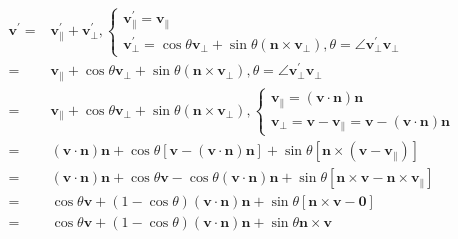 \documentclass[
]{book}
\theoremstyle{definition}
\theoremstyle{definition}
\theoremstyle{definition}
\theoremstyle{definition}
\theoremstyle{remark}
\begin{document}
\[
\begin{aligned}
\boldsymbol{v}^{\prime}= & \boldsymbol{v}_{{\scriptscriptstyle \parallel}}^{\prime}+\boldsymbol{v}_{{\scriptscriptstyle \perp}}^{\prime},\begin{cases}
\boldsymbol{v}_{{\scriptscriptstyle \parallel}}^{\prime}=\boldsymbol{v}_{{\scriptscriptstyle \parallel}}\\
\boldsymbol{v}_{{\scriptscriptstyle \perp}}^{\prime}=\cos\theta\boldsymbol{v}_{{\scriptscriptstyle \perp}}+\sin\theta\left(\boldsymbol{n}\times\boldsymbol{v}_{{\scriptscriptstyle \perp}}\right),\theta=\angle\boldsymbol{v}_{{\scriptscriptstyle \perp}}^{\prime}\boldsymbol{v}_{{\scriptscriptstyle \perp}}
\end{cases}\\
= & \boldsymbol{v}_{{\scriptscriptstyle \parallel}}+\cos\theta\boldsymbol{v}_{{\scriptscriptstyle \perp}}+\sin\theta\left(\boldsymbol{n}\times\boldsymbol{v}_{{\scriptscriptstyle \perp}}\right),\theta=\angle\boldsymbol{v}_{{\scriptscriptstyle \perp}}^{\prime}\boldsymbol{v}_{{\scriptscriptstyle \perp}}\\
= & \boldsymbol{v}_{{\scriptscriptstyle \parallel}}+\cos\theta\boldsymbol{v}_{{\scriptscriptstyle \perp}}+\sin\theta\left(\boldsymbol{n}\times\boldsymbol{v}_{{\scriptscriptstyle \perp}}\right),\begin{cases}
\boldsymbol{v}_{{\scriptscriptstyle \parallel}}=\left(\boldsymbol{v}\cdot\boldsymbol{n}\right)\boldsymbol{n}\\
\boldsymbol{v}_{{\scriptscriptstyle \perp}}=\boldsymbol{v}-\boldsymbol{v}_{{\scriptscriptstyle \parallel}}=\boldsymbol{v}-\left(\boldsymbol{v}\cdot\boldsymbol{n}\right)\boldsymbol{n}
\end{cases}\\
= & \left(\boldsymbol{v}\cdot\boldsymbol{n}\right)\boldsymbol{n}+\cos\theta\left[\boldsymbol{v}-\left(\boldsymbol{v}\cdot\boldsymbol{n}\right)\boldsymbol{n}\right]+\sin\theta\left[\boldsymbol{n}\times\left(\boldsymbol{v}-\boldsymbol{v}_{{\scriptscriptstyle \parallel}}\right)\right]\\
= & \left(\boldsymbol{v}\cdot\boldsymbol{n}\right)\boldsymbol{n}+\cos\theta\boldsymbol{v}-\cos\theta\left(\boldsymbol{v}\cdot\boldsymbol{n}\right)\boldsymbol{n}+\sin\theta\left[\boldsymbol{n}\times\boldsymbol{v}-\boldsymbol{n}\times\boldsymbol{v}_{{\scriptscriptstyle \parallel}}\right]\\
= & \cos\theta\boldsymbol{v}+\left(1-\cos\theta\right)\left(\boldsymbol{v}\cdot\boldsymbol{n}\right)\boldsymbol{n}+\sin\theta\left[\boldsymbol{n}\times\boldsymbol{v}-\boldsymbol{0}\right]\\
= & \cos\theta\boldsymbol{v}+\left(1-\cos\theta\right)\left(\boldsymbol{v}\cdot\boldsymbol{n}\right)\boldsymbol{n}+\sin\theta\boldsymbol{n}\times\boldsymbol{v}
\end{aligned}
\]
\end{document}

